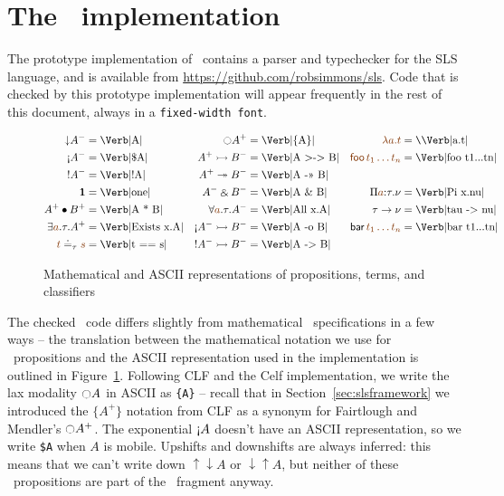 \section{The \sls~implementation}
\label{sec:prototype}

The prototype implementation of \sls~contains a parser and typechecker
for the SLS language, and is available from
\url{https://github.com/robsimmons/sls}. Code that is checked by this
prototype implementation will appear frequently in the rest of this
document, always in a \verb|fixed-width font|.

\begin{figure}
\newcommand{\thingamajig}{=}
\begin{align*}
{\downarrow}A^- & \thingamajig \mbox{\Verb|A|} 
 & {\ocircle}A^+ & \thingamajig \mbox{\Verb|\{A\}|}
 & \lf{\lambda a.t} & \thingamajig \mbox{{\texttt{\char`\\}}\Verb|a.t|}
\\
{\gnab}A^- & \thingamajig \mbox{\Verb|\$A|}
 & A^+ \lefti B^- & \thingamajig \mbox{\Verb|A >-> B|}
 & \lf{{\sf foo}\,t_1\ldots t_n} & \thingamajig \mbox{\Verb|foo t1...tn|}
\\
{!}A^- & \thingamajig \mbox{\Verb|!A|}
 & A^+ \righti B^- & \thingamajig \mbox{\Verb|A ->> B|}
\\
\one & \thingamajig \mbox{\Verb|one|}
 & A^- \with B^- & \thingamajig \mbox{\Verb|A \& B|}
 & \Pi\lf{a}{:}\tau.\nu & \thingamajig \mbox{\Verb|Pi x.nu|}
\\
A^+ \fuse B^+ & \thingamajig \mbox{\Verb|A * B|}
 & \forall \lf{a}.\tau. A^- & \thingamajig \mbox{\Verb|All x.A|}
 & \tau \rightarrow \nu & \thingamajig{\mbox{\Verb|tau -> nu|}}
\\
\exists \lf{a}.\tau. A^+ & \thingamajig \mbox{\Verb|Exists x.A|}
 & {\gnab}A^- \lefti B^- & \thingamajig \mbox{\Verb|A -o B|}
 & {\sf bar}\,\lf{t_1 \ldots t_n} & \thingamajig{\mbox{\Verb|bar t1...tn|}}
\\
\lf{t} \doteq_\tau \lf{s} & \thingamajig \mbox{\Verb|t == s|}
 & {!}A^- \lefti B^- & \thingamajig \mbox{\Verb|A -> B|}
\end{align*}
\caption{Mathematical and ASCII representations of propositions,
  terms, and classifiers}
\label{fig:translate-types}
\end{figure}


The checked \sls~code differs slightly from mathematical
\sls~specifications in a few ways -- the translation between the
mathematical notation we use for \sls~propositions and the ASCII
representation used in the implementation is outlined in
Figure~\ref{fig:translate-types}.  Following CLF and the Celf
implementation, we write the lax modality ${\ocircle}A$ in ASCII as
\verb|{A}| -- recall that in Section~\ref{sec:slsframework} we
introduced the $\{ A^+ \}$ notation from CLF as a synonym for
Fairtlough and Mendler's ${\ocircle}A^+$.  The exponential ${\gnab}A$
doesn't have an ASCII representation, so we write \verb|$A| when $A$
is mobile. Upshifts and downshifts are always inferred: this means
that we can't write down ${\uparrow}{\downarrow}A$ or
${\downarrow}{\uparrow}A$, but neither of these \ollll~propositions
are part of the \sls~fragment anyway.

